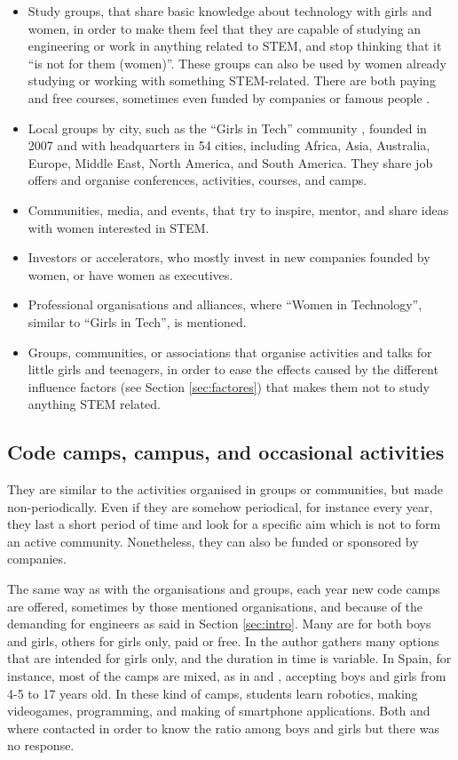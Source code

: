 \documentclass[journal,transmag]{IEEEtran}
\begin{document}
\begin{itemize}
	\item Study groups, that share basic knowledge about technology with girls and women, in order to make them feel that they are capable of studying an engineering or work in anything related to STEM, and stop thinking that it ``is not for them (women)''. These groups can also be used by women already studying or working with something STEM-related. There are both paying and free courses, sometimes even funded by companies or famous people \cite{karliek2012}.
	\item Local groups by city, such as the ``Girls in Tech'' community \cite{git:site}, founded in 2007 and with headquarters in 54 cities, including Africa, Asia, Australia, Europe, Middle East, North America, and South America. They share job offers and organise conferences, activities, courses, and camps.
	\item Communities, media, and events, that try to inspire, mentor, and share ideas with women interested in STEM.
	\item Investors or accelerators, who mostly invest in new companies founded by women, or have women as executives.
	\item Professional organisations and alliances, where ``Women in Technology'', similar to ``Girls in Tech'', is mentioned.
	\item Groups, communities, or associations that organise activities and talks for little girls and teenagers, in order to ease the effects caused by the different influence factors (see Section \ref{sec:factores}) that makes them not to study anything STEM related.
\end{itemize}

\subsection{Code camps, campus, and occasional activities}

They are similar to the activities organised in groups or communities, but made non-periodically. Even if they are somehow periodical, for instance every year, they last a short period of time and look for a specific aim which is not to form an active community. Nonetheless, they can also be funded or sponsored by companies. 

The same way as with the organisations and groups, each year new code camps are offered, sometimes by those mentioned organisations, and because of the demanding for engineers as said in Section \ref{sec:intro}. Many are for both boys and girls, others for girls only, paid or free. In \cite{lauren2015} the author gathers many options that are intended for girls only, and the duration in time is variable. In Spain, for instance, most of the camps are mixed, as in \cite{cmadrid:site} and \cite{cbcn:site}, accepting boys and girls from 4-5 to 17 years old. In these kind of camps, students learn robotics, making videogames, programming, and making of smartphone applications. Both  \cite{cmadrid:site} and \cite{cbcn:site} where contacted in order to know the ratio among boys and girls but there was no response.
\end{document}
